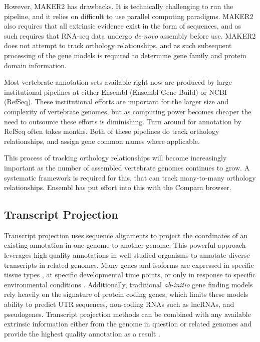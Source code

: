 \documentclass[fleqn,10pt]{wlscirep}
\begin{document}
However, MAKER2 has drawbacks. It is technically challenging to run the pipeline, and it relies on difficult to use parallel computing paradigms. MAKER2 also requires that all extrinsic evidence exist in the form of sequences, and as such requires that RNA-seq data undergo \textit{de-novo} assembly before use. MAKER2 does not attempt to track orthology relationships, and as such subsequent processing of the gene models is required to determine gene family and protein domain information.

Most vertebrate annotation sets available right now are produced by large institutional pipelines at either Ensembl (Ensembl Gene Build) or NCBI (RefSeq). These institutional efforts are important for the larger size and complexity of vertebrate genomes, but as computing power becomes cheaper the need to outsource these efforts is diminishing. Turn around for annotation by RefSeq often takes months. Both of these pipelines do track orthology relationships, and assign gene common names where applicable.

This process of tracking orthology relationships will become increasingly important as the number of assembled vertebrate genomes continues to grow. A systematic framework is required for this, that can track many-to-many orthology relationships. Ensembl has put effort into this with the Compara browser\cite{vilella2009ensemblcompara}.

\subsection{Transcript Projection}

Transcript projection uses sequence alignments to project the coordinates of an existing annotation in one genome to another genome. This powerful approach leverages high quality annotations in well studied organisms to annotate diverse transcripts in related genomes. Many genes and isoforms are expressed in specific tissue types \cite{gtex2015genotype}, at specific developmental time points, or only in response to specific environmental conditions \cite{peng2011integrative}. Additionally, traditional \textit{ab-initio} gene finding models rely heavily on the signature of protein coding genes, which limits these models ability to predict UTR sequences, non-coding RNAs such as lncRNAs, and pseudogenes. Transcript projection methods can be combined with any available extrinsic information either from the genome in question or related genomes and provide the highest quality annotation as a result \cite{stanke2008using}.
\end{document}
